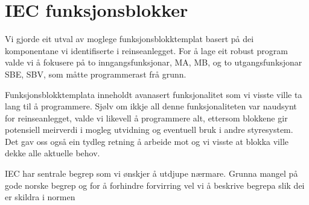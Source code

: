 \section{IEC funksjonsblokker} \label{IEC Seksjon}
\thispagestyle{fancy}

Vi gjorde eit utval av moglege funksjonsblokktemplat basert på dei komponentane vi identifiserte i reinseanlegget.
For å lage eit robust program valde vi å fokusere på to inngangsfunksjonar, \gls{MA}, \gls{MB}, og to utgangsfunksjonar \gls{SBE}, \gls{SBV},
som måtte programmerast frå grunn. 

Funksjonsblokktemplata inneholdt avanasert funksjonalitet som vi visste ville ta lang til å programmere.
Sjølv om ikkje all denne funksjonaliteten var naudsynt for reinseanlegget,
valde vi likevell å programmere alt, ettersom blokkene gir potensiell meirverdi i mogleg utvidning og eventuell bruk i andre styresystem.
Det gav oss også ein tydleg retning å arbeide mot og vi visste at blokka ville dekke alle aktuelle behov.

\gls{IEC} har sentrale begrep som vi ønskjer å utdjupe nærmare. Grunna mangel på gode norske begrep
og for å forhindre forvirring vel vi å beskrive begrepa slik dei er skildra i normen \citep{IECGlossery}

